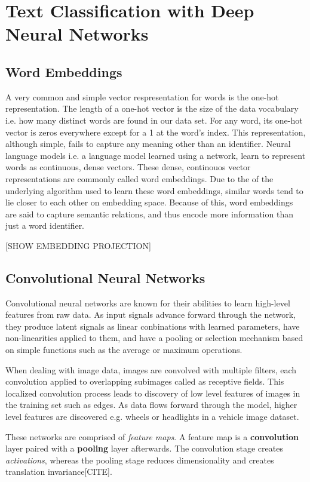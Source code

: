 
\chapter{Text Classification with Deep Neural Networks}\label{TXT-CLASS}

\section{Word Embeddings}
A very common and simple vector respresentation for words is the one-hot representation. The length
of a one-hot vector is the size of the data vocabulary i.e. how many distinct words are found in our data set. For any
word, its one-hot vector is zeros everywhere except for a 1 at the word's index. This representation, although simple,
fails to capture any meaning other than an identifier.
Neural language models i.e. a language model learned using a network, learn to represent words as continuous, dense vectors.
These dense, continouos vector representations are commonly called word embeddings. Due to the of the underlying algorithm
used to learn these word embeddings, similar words tend to lie closer to each other on embedding space.
Because of this, word embeddings are said to capture semantic relations, and thus encode more information than just a word identifier.

[SHOW EMBEDDING PROJECTION]


\section{Convolutional Neural Networks}
Convolutional neural networks are known for their abilities to learn high-level features from raw data. As input signals advance
forward through the network, they produce latent signals as linear conbinations with learned parameters, have non-linearities applied
to them, and have a pooling or selection mechanism based on simple functions such as the average or maximum operations.

When dealing with image data, images are convolved with multiple filters, each convolution applied to overlapping subimages called as receptive fields.
This localized convolution process leads to discovery of low level features of images in the training set such as edges. As data
flows forward through the model, higher level features are discovered e.g. wheels or headlights in a vehicle image dataset.

These networks are comprised of \textit{feature maps}. A feature map is a \textbf{convolution} layer paired with a
\textbf{pooling} layer afterwards. The convolution stage creates \textit{activations}, whereas the pooling stage
reduces dimensionality and creates translation invariance[CITE].

